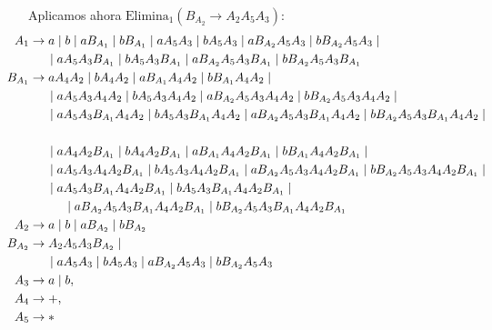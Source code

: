\documentclass[12pt]{article}
\begin{document}
\begin{ejercicio}[2.5 puntos]
\begin{description}
        Aplicamos ahora $\text{Elimina}_1(B_{A_2}\rightarrow A_2 A_5 A_3)$:
        \begin{align*}
            \hspace{-2.5cm}A_1 &\to  a \mid b\mid a B_{A_1} \mid b B_{A_1}
                \mid  aA_5A_3 \mid bA_5A_3 \mid   a B_{A_2}A_5A_3 \mid  b B_{A_2}A_5A_3
                \mid \\ & \hspace{0.5cm} \mid  aA_5 A_3 B_{A_1} \mid bA_5 A_3 B_{A_1} \mid   a B_{A_2}A_5 A_3 B_{A_1}
                \mid b B_{A_2}A_5 A_3 B_{A_1} \\
            \hspace{-2.5cm}B_{A_1} &\to  aA_4 A_2 \mid bA_4 A_2\mid a B_{A_1}A_4 A_2 \mid b B_{A_1}A_4 A_2
                \mid \\ & \hspace{0.5cm} \mid  aA_5A_3 A_4 A_2\mid bA_5A_3A_4 A_2 \mid   a B_{A_2}A_5A_3A_4 A_2
                \mid b B_{A_2}A_5A_3A_4 A_2
                \mid \\ & \hspace{0.5cm} \mid  aA_5 A_3 B_{A_1}A_4 A_2 \mid bA_5 A_3 B_{A_1}A_4 A_2
               \mid  a B_{A_2}A_5 A_3 B_{A_1}A_4 A_2 \mid b B_{A_2}A_5 A_3 B_{A_1}A_4 A_2
                \mid \\ \hspace{-2.5cm}\\ & \hspace{0.5cm} \mid  aA_4 A_2 B_{A_1} \mid bA_4 A_2 B_{A_1}\mid a B_{A_1}A_4 A_2 B_{A_1}
                 \mid b B_{A_1}A_4 A_2 B_{A_1}
                \mid \\ & \hspace{0.5cm} \mid  aA_5A_3 A_4 A_2 B_{A_1}\mid bA_5A_3A_4 A_2 B_{A_1} 
                 \mid  a B_{A_2}A_5A_3A_4 A_2 B_{A_1} \mid b B_{A_2}A_5A_3A_4 A_2 B_{A_1}
                \mid \\ & \hspace{0.5cm} \mid  aA_5 A_3 B_{A_1}A_4 A_2 B_{A_1} \mid bA_5 A_3 B_{A_1}A_4 A_2 B_{A_1}
                \mid \\ & \hspace{1cm}  \mid  a B_{A_2}A_5 A_3 B_{A_1}A_4 A_2 B_{A_1} \mid b B_{A_2}A_5 A_3 B_{A_1}A_4 A_2 B_{A_1} \\
            \hspace{-2.5cm}A_2 &\to  a \mid b \mid   a B_{A_2} \mid  b B_{A_2} \\
            \hspace{-2.5cm}B_{A_2} & \to A_2 A_5 A_3 B_{A_2}
                \mid \\ & \hspace{0.5cm}  \mid aA_5 A_3 \mid b A_5 A_3\mid   a B_{A_2}A_5 A_3 \mid  b B_{A_2}A_5 A_3 \\
            \hspace{-2.5cm}A_3 &\to  a \mid b,\\
            \hspace{-2.5cm}A_4 &\to +,\\
            \hspace{-2.5cm}A_5 &\to *
        \end{align*}


\end{description}
\end{ejercicio}
\end{document}
